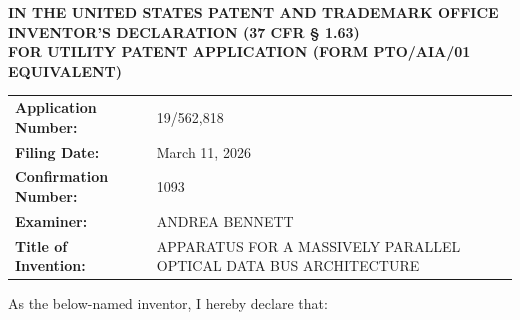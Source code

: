 \documentclass[11pt,letterpaper]{article}
\begin{document}
\thispagestyle{empty}

\begin{center}
    \textbf{\large IN THE UNITED STATES PATENT AND TRADEMARK OFFICE} \\
    \vspace{0.3cm}
    \textbf{\large INVENTOR'S DECLARATION (37 CFR \S{} 1.63)} \\
    \textbf{\normalsize FOR UTILITY PATENT APPLICATION (FORM PTO/AIA/01 EQUIVALENT)}
\end{center}

\vspace{0.4cm}
\noindent\begin{tabular}{p{2.3in}p{4.0in}}
\textbf{Application Number:} & 19/562,818 \\
\textbf{Filing Date:} & March 11, 2026 \\
\textbf{Confirmation Number:} & 1093 \\
\textbf{Examiner:} & ANDREA BENNETT \\
\textbf{Title of Invention:} & APPARATUS FOR A MASSIVELY PARALLEL OPTICAL DATA BUS ARCHITECTURE \\
\end{tabular}

\vspace{0.6cm}
As the below-named inventor, I hereby declare that:
\end{document}
